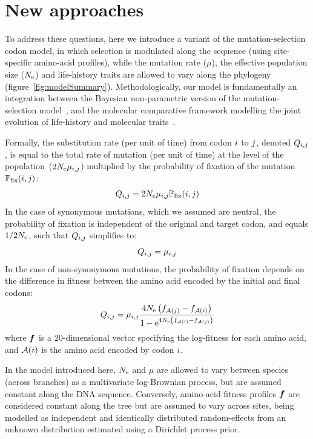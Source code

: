 \documentclass{MBE}
\begin{document}
	\section{New approaches}
	\label{sec:NewApproaches}
	To address these questions, here we introduce a variant of the mutation-selection {codon} model, in which selection is modulated along the sequence (using site-specific amino-acid profiles), while the mutation rate ($\mu$), the {effective population size} ($N_{\text{e}}$) and life-history traits are allowed to vary along the phylogeny (figure~\ref{fig:modelSummary}).
	Methodologically, our model is fundamentally an integration between the Bayesian non-parametric version of the \citet{Halpern1998} mutation-selection model~\citep{Rodrigue2014}, and the molecular comparative framework modelling the joint evolution of life-history and molecular traits~\citep{Lartillot2011}.

	Formally, the {substitution} rate (per unit of time) from {codon} ${i}$ to ${j}$, denoted $Q_{{i}, {j}}$, is equal to the total rate of mutation (per unit of time) at the level of the population~($2N_{\text{e}}\mu_{{i}, {j}}$) multiplied by the probability of fixation of the mutation $\mathbb{P}_{\text{fix}}({i}, {j})$:
	\begin{equation}
	{Q_{{i}, {j}}}
		= 2 N_{\text{e}} \mu_{{i}, {j}} \mathbb{P}_{\text{fix}}({i}, {j})
	\end{equation}
	In the case of {synonymous} mutations, which we assumed are {neutral}, the probability of fixation is independent of the original and target {codon}, and equals $1/2 N_{\text{e}}$, such that ${Q_{{i}, {j}}}$ simplifies to:
	\begin{equation}
		Q_{{i}, {j}} = \mu_{{i}, {j}}
	\end{equation}
	In the case of {non-synonymous} mutations, the probability of fixation depends on the difference in fitness between the amino acid encoded by the initial and final codons:
	\begin{equation}
		\label{eq:mutationSelection}
		{\submatrix_{\itoj}} = \mu_{\itoj} \dfrac{4 \Ne \left({\fitj - \fiti}\right)}{{1 - \e^{4 \Ne \left({\fiti - \fitj}\right)} }}
	\end{equation}
	where $\bm{f}$ is a $20$-dimensional vector specifying the log-fitness for each amino acid, and $\mathcal{A}({i})$ is the amino acid encoded by {codon} $i$.

	In the model introduced here, $N_{\text{e}}$ and $\mu$ are allowed to vary between species (across branches) as a multivariate log-Brownian process, but are assumed constant along the {DNA} sequence.
	Conversely, amino-acid fitness profiles $\bm{f}$ are considered constant along the tree but are assumed to vary across sites, being modelled as independent and identically distributed random-effects from an unknown distribution estimated using a {Dirichlet process} {prior}.
\end{document}

